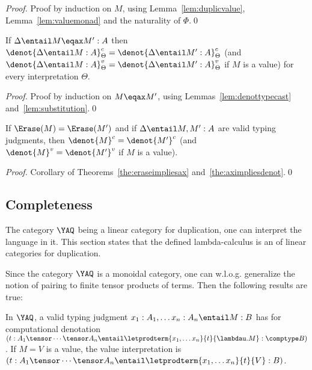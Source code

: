 \documentclass{llncs}
\begin{document}
\begin{proof}
  Proof by induction on $M$, using Lemma~\ref{lem:duplicvalue},
  Lemma~\ref{lem:valuemonad} and the naturality of $\Phi$.\qed
\end{proof}



\begin{theorem}\label{the:aximpliesdenot}
  If $\Delta\entail M\eqax M':A$ then
  $\denot{\Delta\entail M:A}^c_\Theta=\denot{\Delta\entail
  M':A}^c_\Theta$ (and $\denot{\Delta\entail
  M:A}^v_\Theta=\denot{\Delta\entail
  M':A}^v_\Theta$ if $M$ is a value) for every interpretation $\Theta$.
\end{theorem}

\begin{proof}
  Proof by induction on $M\eqax M'$, using
  Lemmas~\ref{lem:denottypecast} and~\ref{lem:substitution}.\qed
\end{proof}


\begin{corollary}\label{cor:erasuredenot}
  If $\Erase(M)=\Erase(M')$ and if $\Delta\entail M,M':A$ are valid
  typing judgments, then $\denot{M}^c=\denot{M'}^c$ (and
  $\denot{M}^v=\denot{M'}^v$ if $M$ is a value).
\end{corollary}

\begin{proof}
  Corollary of Theorems~\ref{the:eraseimpliesax}
  and~\ref{the:aximpliesdenot}.\qed
\end{proof}



\subsection{Completeness}


The category $\YAQ$ being a linear category for duplication, one
can interpret the language in it. This section states that the defined
lambda-calculus is an  of linear categories
for duplication.


Since the category $\YAQ$ is a monoidal category, one can
w.l.o.g. generalize the notion of pairing to finite tensor products of
terms. Then the following results are true:



\begin{lemma}\label{lem:yaqcomplete}
  In $\YAQ$, a valid typing judgment $x_1:A_1,\ldots
  x_n:A_n\entail M:B$ has for computational denotation
  $(t:A_1\tensor\cdots\tensor A_n\entail \letprodterm{x_1,\ldots
  x_n}{t}{\lambdau.M}:\comptype B)$. If $M=V$ is a value, the value
  interpretation is
  $(t:A_1\tensor\cdots\tensor A_n\entail
  \letprodterm{x_1,\ldots x_n}{t}{V}:B)$.
\end{lemma}
\end{document}
